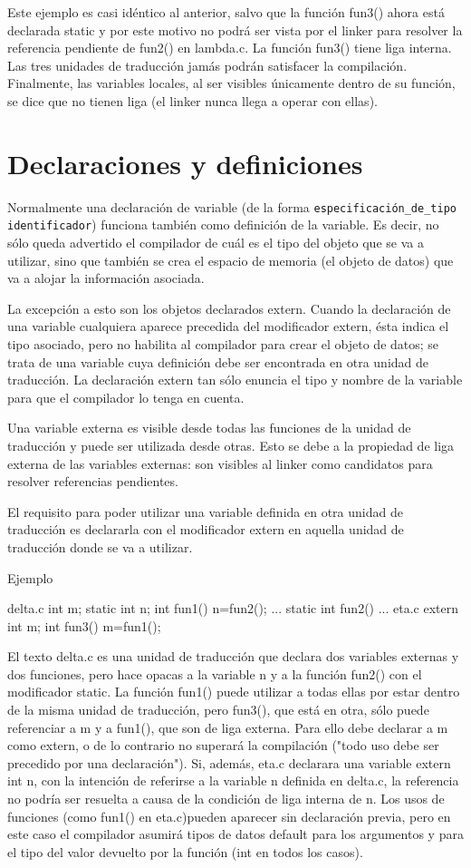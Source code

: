 Este ejemplo es casi idéntico al anterior, salvo que la función fun3() ahora está declarada static y por
este motivo no podrá ser vista por el linker para resolver la referencia pendiente de fun2() en
lambda.c. La función fun3() tiene liga interna. Las tres unidades de traducción jamás podrán
satisfacer la compilación.
Finalmente, las variables locales, al ser visibles únicamente dentro de su función, se dice que no
tienen liga (el linker nunca llega a operar con ellas).

\section{Declaraciones y definiciones}
Normalmente una declaración de variable (de la forma \texttt{especificación\_de\_tipo identificador}) funciona
también como definición de la variable. Es decir, no sólo queda advertido el compilador de cuál es el
tipo del objeto que se va a utilizar, sino que también se crea el espacio de memoria (el objeto de datos)
que va a alojar la información asociada.

La excepción a esto son los objetos declarados extern. Cuando la declaración de una variable
cualquiera aparece precedida del modificador extern, ésta indica el tipo asociado, pero no habilita al
compilador para crear el objeto de datos; se trata de una variable cuya definición debe ser encontrada
en otra unidad de traducción. La declaración extern tan sólo enuncia el tipo y nombre de la variable
para que el compilador lo tenga en cuenta.

Una variable externa es visible desde todas las funciones de la unidad de traducción y puede ser
utilizada desde otras. Esto se debe a la propiedad de liga externa de las variables externas: son visibles
al linker como candidatos para resolver referencias pendientes.

El requisito para poder utilizar una variable definida en otra unidad de traducción es declararla con el
modificador extern en aquella unidad de traducción donde se va a utilizar.

Ejemplo


delta.c
int m;
static int n;
int fun1()
{
n=fun2();
...
}
static int fun2()
{
...
eta.c
extern int m;
int fun3()
{
m=fun1();
}
}

El texto delta.c es una unidad de traducción que declara dos variables externas y dos funciones, pero
hace opacas a la variable n y a la función fun2() con el modificador static. La función fun1() puede
utilizar a todas ellas por estar dentro de la misma unidad de traducción, pero fun3(), que está en otra,
sólo puede referenciar a m y a fun1(), que son de liga externa. Para ello debe declarar a m como
extern, o de lo contrario no superará la compilación ("todo uso debe ser precedido por una
declaración").
Si, además, eta.c declarara una variable extern int n, con la intención de referirse a la variable n
definida en delta.c, la referencia no podría ser resuelta a causa de la condición de liga interna de n.
Los usos de funciones (como fun1() en eta.c)pueden aparecer sin declaración previa, pero en este caso
el compilador asumirá tipos de datos default para los argumentos y para el tipo del valor devuelto por
la función (int en todos los casos).

